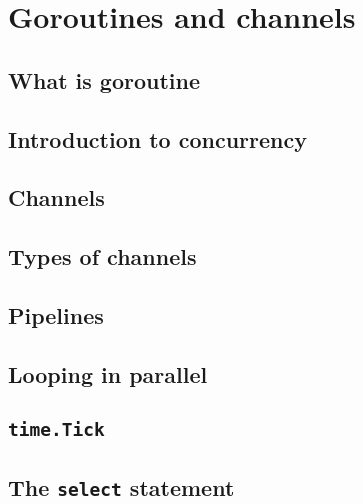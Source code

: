 \documentclass[]{book}
\begin{document}
\hypertarget{goroutines-and-channels}{%
\chapter{Goroutines and channels}\label{goroutines-and-channels}}

\hypertarget{what-is-goroutine}{%
\section{What is goroutine}\label{what-is-goroutine}}

\hypertarget{introduction-to-concurrency}{%
\section{Introduction to concurrency}\label{introduction-to-concurrency}}

\hypertarget{channels}{%
\section{Channels}\label{channels}}

\hypertarget{types-of-channels}{%
\section{Types of channels}\label{types-of-channels}}

\hypertarget{pipelines}{%
\section{Pipelines}\label{pipelines}}

\hypertarget{looping-in-parallel}{%
\section{Looping in parallel}\label{looping-in-parallel}}

\hypertarget{time.tick}{%
\section{\texorpdfstring{\texttt{time.Tick}}{time.Tick}}\label{time.tick}}

\hypertarget{the-select-statement}{%
\section{\texorpdfstring{The \texttt{select} statement}{The select statement}}\label{the-select-statement}}
\end{document}
